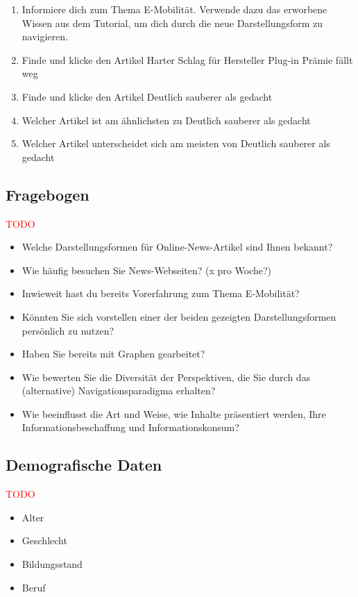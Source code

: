 \begin{enumerate}
    \item Informiere dich zum Thema E-Mobilität. Verwende dazu das erworbene Wissen aus dem Tutorial, um dich durch die neue Darstellungsform zu navigieren.
    \item Finde und klicke den Artikel \glqq Harter Schlag für Hersteller Plug-in Prämie fällt weg\grqq{}
    \item Finde und klicke den Artikel \glqq Deutlich sauberer als gedacht\grqq{}
    \item Welcher Artikel ist am ähnlichsten zu \glqq Deutlich sauberer als gedacht\grqq{}
    \item Welcher Artikel unterscheidet sich am meisten von \glqq Deutlich sauberer als gedacht\grqq{}
\end{enumerate}

\subsection{Fragebogen}
\textcolor{red}{TODO}

\begin{itemize}
    \item Welche Darstellungsformen für Online-News-Artikel sind Ihnen bekannt?
    \item Wie häufig besuchen Sie News-Webseiten? (x pro Woche?)
    \item Inwieweit hast du bereits Vorerfahrung zum Thema E-Mobilität?
    \item Könnten Sie sich vorstellen einer der beiden gezeigten Darstellungsformen persönlich zu nutzen?
    \item Haben Sie bereits mit Graphen gearbeitet?
    \item Wie bewerten Sie die Diversität der Perspektiven, die Sie durch das (alternative) Navigationsparadigma erhalten?
    \item Wie beeinflusst die Art und Weise, wie Inhalte präsentiert werden, Ihre Informationsbeschaffung und Informationskonsum?
\end{itemize}

\subsection{Demografische Daten}
\textcolor{red}{TODO}
\begin{itemize}
    \item Alter
    \item Geschlecht
    \item Bildungsstand
    \item Beruf
\end{itemize}